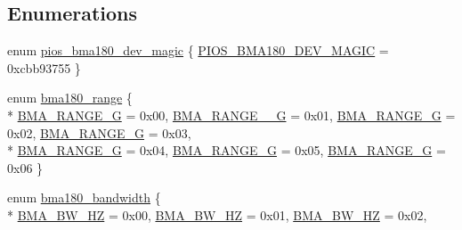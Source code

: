 \subsection*{Enumerations}
\begin{DoxyCompactItemize}
\item 
enum \hyperlink{group___p_i_o_s___b_m_a180_ga019b2d5aa99a1a8e1b760c201899fa64}{pios\-\_\-bma180\-\_\-dev\-\_\-magic} \{ \hyperlink{group___p_i_o_s___b_m_a180_gga019b2d5aa99a1a8e1b760c201899fa64a7aec37002a2253d103974e52b5994e74}{P\-I\-O\-S\-\_\-\-B\-M\-A180\-\_\-\-D\-E\-V\-\_\-\-M\-A\-G\-I\-C} = 0xcbb93755
 \}
\item 
enum \hyperlink{group___p_i_o_s___b_m_a180_ga319b0b37d7184097d2ae4e7ba527a416}{bma180\-\_\-range} \{ \\*
\hyperlink{group___p_i_o_s___b_m_a180_gga319b0b37d7184097d2ae4e7ba527a416a7a0fa3f83070097604fa2c26cec0d197}{B\-M\-A\-\_\-\-R\-A\-N\-G\-E\-\_\-G} = 0x00, 
\hyperlink{group___p_i_o_s___b_m_a180_gga319b0b37d7184097d2ae4e7ba527a416aba39596e59ef5c1b698fd07fb70aeb59}{B\-M\-A\-\_\-\-R\-A\-N\-G\-E\-\_\-\_\-G} = 0x01, 
\hyperlink{group___p_i_o_s___b_m_a180_gga319b0b37d7184097d2ae4e7ba527a416a3baba1647f1b31a0ca85c4b4b4460219}{B\-M\-A\-\_\-\-R\-A\-N\-G\-E\-\_\-G} = 0x02, 
\hyperlink{group___p_i_o_s___b_m_a180_gga319b0b37d7184097d2ae4e7ba527a416a689f60fc8cd363d6104d30fd2f7b653a}{B\-M\-A\-\_\-\-R\-A\-N\-G\-E\-\_\-G} = 0x03, 
\\*
\hyperlink{group___p_i_o_s___b_m_a180_gga319b0b37d7184097d2ae4e7ba527a416a88eeec78073940a1aaf2b96f9988dc39}{B\-M\-A\-\_\-\-R\-A\-N\-G\-E\-\_\-G} = 0x04, 
\hyperlink{group___p_i_o_s___b_m_a180_gga319b0b37d7184097d2ae4e7ba527a416a13d252a0a2ceb78c19757b6e1d69a4f7}{B\-M\-A\-\_\-\-R\-A\-N\-G\-E\-\_\-G} = 0x05, 
\hyperlink{group___p_i_o_s___b_m_a180_gga319b0b37d7184097d2ae4e7ba527a416a65bb98b2bfac0f9f4e57161b4f8cc7cc}{B\-M\-A\-\_\-\-R\-A\-N\-G\-E\-\_\-G} = 0x06
 \}
\item 
enum \hyperlink{group___p_i_o_s___b_m_a180_gacd6d3ecff286f705778973637b4d3d99}{bma180\-\_\-bandwidth} \{ \\*
\hyperlink{group___p_i_o_s___b_m_a180_ggacd6d3ecff286f705778973637b4d3d99ac9ccb62e227873e7408c0d394b9cbd04}{B\-M\-A\-\_\-\-B\-W\-\_\-H\-Z} = 0x00, 
\hyperlink{group___p_i_o_s___b_m_a180_ggacd6d3ecff286f705778973637b4d3d99a808875d1f84c211d3d1ec23adcfd3231}{B\-M\-A\-\_\-\-B\-W\-\_\-H\-Z} = 0x01, 
\hyperlink{group___p_i_o_s___b_m_a180_ggacd6d3ecff286f705778973637b4d3d99ad6870da0b3613eb59cf69292dee259d2}{B\-M\-A\-\_\-\-B\-W\-\_\-H\-Z} = 0x02, 

\end{DoxyCompactItemize}
